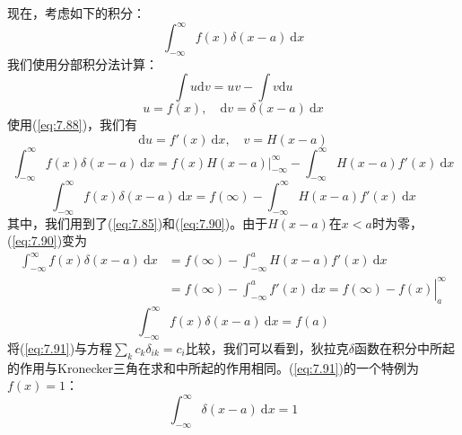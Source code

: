     现在，考虑如下的积分：
    \begin{equation*}
        \int_{-\infty}^{\infty}f\left(x\right)\delta\left(x-a\right)\:\mathrm{d}x
    \end{equation*}
    我们使用分部积分法计算：
    \begin{equation*}
        \int u \mathrm{d}v = uv - \int v \mathrm{d}u
    \end{equation*}
    \begin{equation*}
        u = f\left(x\right), \quad \mathrm{d}v = \delta\left(x-a\right)\:\mathrm{d}x
    \end{equation*}
    使用(\ref{eq:7.88})，我们有
    \begin{equation*}
        \mathrm{d}u = f'\left(x\right)\:\mathrm{d}x, \quad v = H\left(x-a\right)
    \end{equation*}
    \begin{equation*}
        \int_{-\infty}^{\infty}f\left(x\right)\delta\left(x-a\right)\:\mathrm{d}x = f\left(x\right)H\left(x-a\right)\bigg|_{-\infty}^{\infty} - \int_{-\infty}^{\infty}H\left(x-a\right)f'\left(x\right)\:\mathrm{d}x
    \end{equation*}
    \begin{equation}
        \int_{-\infty}^{\infty}f\left(x\right)\delta\left(x-a\right)\:\mathrm{d}x = f\left(\infty\right) - \int_{-\infty}^{\infty}H\left(x-a\right)f'\left(x\right)\:\mathrm{d}x
        \label{eq:7.90}
    \end{equation}
    其中，我们用到了(\ref{eq:7.85})和(\ref{eq:7.90})。由于$H\left(x-a\right)$在$x < a$时为零，(\ref{eq:7.90})变为
    \begin{equation*}
        \begin{aligned}
            \int_{-\infty}^{\infty}f\left(x\right)\delta\left(x-a\right)\:\mathrm{d}x & = f\left(\infty\right) - \int_{-\infty}^{a}H\left(x-a\right)f'\left(x\right)\:\mathrm{d}x \\
            & = \left.f\left(\infty\right) - \int_{-\infty}^{a}f'\left(x\right)\:\mathrm{d}x =  f\left(\infty\right) - f\left(x\right) \right|_{a}^{\infty}
        \end{aligned}
    \end{equation*}
    \begin{equation}
        \int_{-\infty}^{\infty}f\left(x\right)\delta\left(x-a\right)\:\mathrm{d}x = f\left(a\right)
        \label{eq:7.91}
    \end{equation}
    将(\ref{eq:7.91})与方程$\sum_{k}c_k\delta_{ik} = c_i$比较，我们可以看到，狄拉克$\delta$函数在积分中所起的作用与Kronecker三角在求和中所起的作用相同。(\ref{eq:7.91})的一个特例为$f\left(x\right) = 1$：
    \begin{equation*}
        \int_{-\infty}^{\infty}\delta\left(x-a\right)\:\mathrm{d}x = 1
    \end{equation*}

